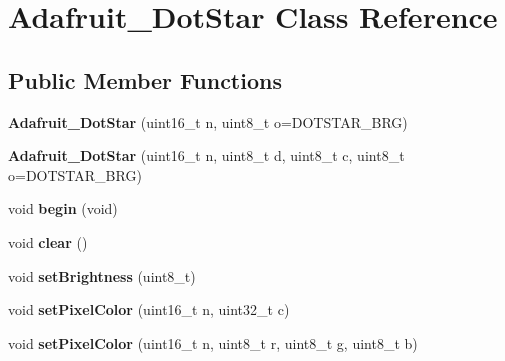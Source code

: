 \hypertarget{class_adafruit___dot_star}{}\section{Adafruit\+\_\+\+Dot\+Star Class Reference}
\label{class_adafruit___dot_star}
\subsection*{Public Member Functions}
\begin{DoxyCompactItemize}
\item 
\mbox{\label{class_adafruit___dot_star_a0634d5672982360e89a9a4699bc42adc}} 
{\bfseries Adafruit\+\_\+\+Dot\+Star} (uint16\+\_\+t n, uint8\+\_\+t o=D\+O\+T\+S\+T\+A\+R\+\_\+\+B\+RG)
\item 
\mbox{\label{class_adafruit___dot_star_a2fce3fd6bfe6e5caaa7a1308197d638b}} 
{\bfseries Adafruit\+\_\+\+Dot\+Star} (uint16\+\_\+t n, uint8\+\_\+t d, uint8\+\_\+t c, uint8\+\_\+t o=D\+O\+T\+S\+T\+A\+R\+\_\+\+B\+RG)
\item 
\mbox{\label{class_adafruit___dot_star_a3997ec5bf3462151cd1c24b7f269f4e3}} 
void {\bfseries begin} (void)
\item 
\mbox{\label{class_adafruit___dot_star_aa050b4379afcd3cdb06dedc83559a58a}} 
void {\bfseries clear} ()
\item 
\mbox{\label{class_adafruit___dot_star_a1be7cf16db725561efe46b4fa2d1a2ac}} 
void {\bfseries set\+Brightness} (uint8\+\_\+t)
\item 
\mbox{\label{class_adafruit___dot_star_ae543eb78d34e89ea3aa9979f43cc527d}} 
void {\bfseries set\+Pixel\+Color} (uint16\+\_\+t n, uint32\+\_\+t c)
\item 
\mbox{\label{class_adafruit___dot_star_ab7ffd239f3d7d1c3a3fa93449eac348e}} 
void {\bfseries set\+Pixel\+Color} (uint16\+\_\+t n, uint8\+\_\+t r, uint8\+\_\+t g, uint8\+\_\+t b)
\item 
\mbox{\label{class_adafruit___dot_star_a9d30a34843a7eebe6e45e9b4fbc69d69}} 

\end{DoxyCompactItemize}
